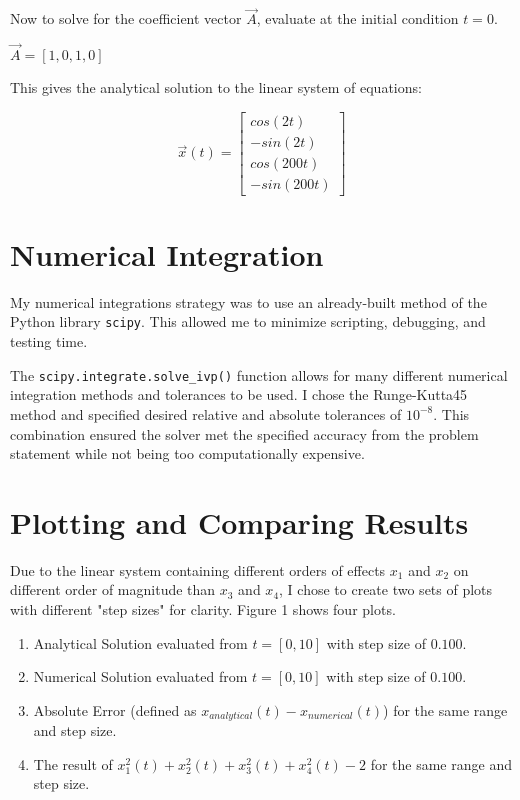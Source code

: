 \documentclass[11pt, oneside]{article}   	%
\begin{document}
Now to solve for the coefficient vector $\vec{A}$, evaluate at the initial condition $t = 0$.

$\vec{A} = [1, 0, 1, 0]$

This gives the analytical solution to the linear system of equations:



\[
\vec{x}(t) = 
\left[
\begin{array}{ccc}
 cos(2t)  \\
 -sin(2t)  \\
 cos(200t)  \\
 -sin(200t)
\end{array}
\right]
\]


\section{Numerical Integration}
My numerical integrations strategy was to use an already-built method of the Python library \verb!scipy!. This allowed me to minimize scripting, debugging, and testing time. 

The \verb!scipy.integrate.solve_ivp()! function allows for many different numerical integration methods and tolerances to be used. I chose the Runge-Kutta45 method and specified desired relative and absolute tolerances of $10^{-8}$. This combination ensured the solver met the specified accuracy from the problem statement while not being too computationally expensive.

\section{Plotting and Comparing Results}
Due to the linear system containing different orders of effects $x_1$ and $x_2$ on different order of magnitude than $x_3$ and $x_4$, I chose to create two sets of plots with different "step sizes" for clarity.
Figure 1 shows four plots.
\begin{enumerate}
\item Analytical Solution evaluated from $t = [0, 10]$ with step size of $0.100$.
\item Numerical Solution evaluated from $t = [0, 10]$ with step size of $0.100$.
\item Absolute Error (defined as $x_{analytical}(t) - x_{numerical}(t)$) for the same range and step size.
\item The result of $x^2_1(t) + x^2_2(t) + x^2_3(t) + x^2_4(t) - 2$ for the same range and step size.
\end{enumerate}
\end{document}
